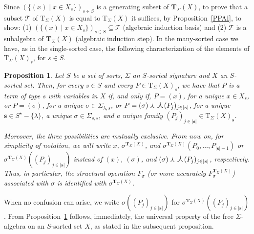 \documentclass[a4paper, reqno
]{amsart}
\newcommand{\concat}{\ensuremath{\text{\Large $\curlywedge$}}}
\newcommand{\bb}[1]{\ensuremath{\lvert #1 \rvert}}
\theoremstyle{plain}
\newtheorem{proposition}[theorem]{Proposition}
\theoremstyle{definition}
\begin{document}
Since $(\{(x)\mid x\in X_{s}\})_{s\in S}$ is a generating subset of $\mathbf{T}_{\Sigma}(X)$, to prove that a subset $\mathcal{T}$ of $\mathrm{T}_{\Sigma}(X)$ is equal to $\mathrm{T}_{\Sigma}(X)$ it suffices, by Proposition~\ref{PPAI}, to show: (1) $(\{(x)\mid x\in X_{s}\})_{s\in S}\subseteq \mathcal{T}$ (algebraic induction basis) and (2) $\mathcal{T}$ is a subalgebra of $\mathbf{T}_{\Sigma}(X)$ (algebraic induction step).
In the many-sorted case we have, as in the single-sorted case, the following characterization of the elements of $\mathrm{T}_{\Sigma}(X)_{s}$, for $s\in S$.

\begin{proposition}\label{PTermChar}
Let $S$ be a set of sorts, $\Sigma$ an $S$-sorted signature and $X$ an $S$-sorted set.
Then, for every $s\in S$ and every $P\in \mathrm{T}_{\Sigma}(X)_{s}$, we have that $P$ is a term of type $s$ with variables in $X$ if, and only if, $P = (x)$, for a unique $x\in X_{s}$, or $P = (\sigma)$, for a unique $\sigma\in\Sigma_{\lambda,s}$, or $P = (\sigma)\curlywedge\concat(P_{j})_{j\in\bb{\mathbf{s}}}$, for a unique $\mathbf{s}\in S^{\star}-\{\lambda\}$, a unique $\sigma\in\Sigma_{\mathbf{s},s}$, and a unique family $(P_{j})_{j\in\bb{\mathbf{s}}}\in\mathrm{T}_{\Sigma}(X)_{\mathbf{s}}$.

Moreover, the three possibilities are mutually exclusive.
From now on, for simplicity of notation, we will write $x$, $\sigma^{\mathbf{T}_{\Sigma}(X)}$, and $\sigma^{\mathbf{T}_{\Sigma}(X)}(P_{0},\ldots,P_{\bb{\mathbf{s}}-1})$ or $\sigma^{\mathbf{T}_{\Sigma}(X)}((P_{j})_{j\in \bb{\mathbf{s}}})$ instead of $(x)$, $(\sigma)$, and $(\sigma)\curlywedge\concat(P_{j})_{j\in\bb{\mathbf{s}}}$, respectively.
Thus, in particular, the structural operation $F_{\sigma}$ (or more accurately $F_{\sigma}^{\mathbf{T}_{\Sigma}(X)}$) associated with $\sigma$ is identified with $\sigma^{\mathbf{T}_{\Sigma}(X)}$.
\end{proposition}

When no confusion can arise, we write $\sigma((P_{j})_{j\in\bb{\mathbf{s}}})$ for $\sigma^{\mathbf{T}_{\Sigma}(X)}((P_{j})_{j\in\bb{\mathbf{s}}})$.
From Proposition~\ref{PTermChar} follows, immediately, the universal property of the free $\Sigma$-algebra on an $S$-sorted set $X$, as stated in the subsequent proposition.
\end{document}
